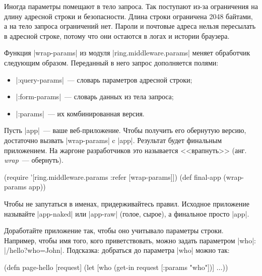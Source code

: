 Иногда параметры помещают в тело запроса. Так поступают из-за ограничения на
длину адресной строки и безопасности. Длина строки ограничена 2048 байтами, а на
тело запроса ограничений нет. Пароли и почтовые адреса нельзя пересылать в
адресной строке, потому что они остаются в логах и истории браузера.

Функция \spverb|wrap-params| из модуля \spverb|ring.middleware.params| меняет
обработчик следующим образом. Переданный в него запрос дополняется полями:

\begin{itemize}

\item
  \spverb|:query-params|~--- словарь параметров адресной строки;

\item
  \spverb|:form-params|~--- словарь данных из тела запроса;

\item
  \spverb|:params|~--- их комбинированная версия.

\end{itemize}

Пусть \spverb|app|~--- ваше веб-приложение. Чтобы получить его обернутую версию,
достаточно вызвать \spverb|wrap-params| c \spverb|app|. Результат будет
финальным приложением. На жаргоне разработчиков это называется <<врапнуть>>
(анг. \emph{wrap}~--- обернуть).

\begin{english}
  \begin{clojure}
(require '[ring.middleware.params :refer [wrap-params]])
(def final-app (wrap-params app))
  \end{clojure}
\end{english}

Чтобы не запутаться в именах, придерживайтесь правил. Исходное приложение
называйте \spverb|app-naked| или \spverb|app-raw| (голое, сырое), а финальное
просто \spverb|app|.

Доработайте приложение так, чтобы оно учитывало параметры строки. Например,
чтобы имя того, кого приветствовать, можно задать параметром \spverb|who|:
\spverb|/hello?who=John|. Подсказка: добраться до параметра \spverb|who| можно
так:

\begin{english}
  \begin{clojure}
(defn page-hello [request]
  (let [who (get-in request [:params "who"])]
    ...))
  \end{clojure}
\end{english}


